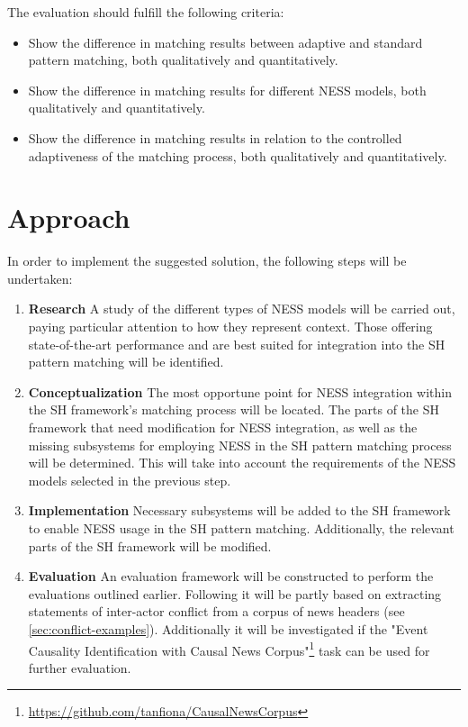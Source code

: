 \documentclass[11pt]{scrreprt}
\let\citef\cite  %
\let\cite\parencite  %
\begin{document}
The evaluation should fulfill the following criteria:

\begin{itemize}
	\item Show the difference in matching results between adaptive and standard pattern matching, both qualitatively and quantitatively.
	\item Show the difference in matching results for different NESS models, both qualitatively and quantitatively.
	\item Show the difference in matching results in relation to the controlled adaptiveness of the matching process, both qualitatively and quantitatively.


\end{itemize}

\section{Approach}
In order to implement the suggested solution, the following steps will be undertaken:

\begin{enumerate}
 	\item \textbf{Research}
	A study of the different types of NESS models will be carried out, paying particular attention to how they represent context. Those offering state-of-the-art performance and are best suited for integration into the SH pattern matching will be identified.
 	\item \textbf{Conceptualization}
 	The most opportune point for NESS integration within the SH framework's matching process will be located. The parts of the SH framework that need modification for NESS integration, as well as the missing subsystems for employing NESS in the SH pattern matching process will be determined. This will take into account the requirements of the NESS models selected in the previous step.
 	\item \textbf{Implementation}
	Necessary subsystems will be added to the SH framework to enable NESS usage in the SH pattern matching. Additionally, the relevant parts of the SH framework will be modified.
 	\item \textbf{Evaluation}
 	An evaluation framework will be constructed to perform the evaluations outlined earlier. Following \citef{menezesSemanticHypergraphs2021} it will be partly based on extracting statements of inter-actor conflict from a  corpus of news headers (see \cref{sec:conflict-examples}). Additionally it will be investigated if the "Event Causality Identification with Causal News Corpus"\footnote{\url{https://github.com/tanfiona/CausalNewsCorpus}} task can be used for further evaluation.
\end{enumerate} 	
\end{document}
